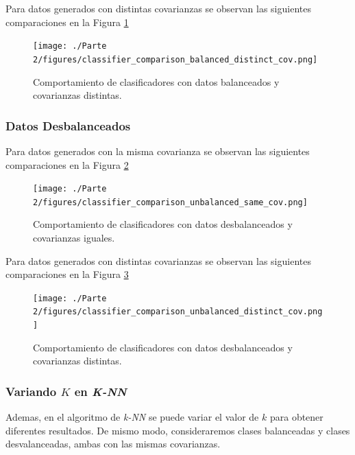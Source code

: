 \documentclass[10pt]{article}
\begin{document}
Para datos generados con distintas covarianzas se observan las siguientes
comparaciones en la Figura \ref{fig:classifier-comparison-balanced-distinct-cov}

\begin{figure}[ht]
    \centering
    \texttt{[image: ./Parte 2/figures/classifier\_comparison\_balanced\_distinct\_cov.png]}
    \caption{Comportamiento de clasificadores con datos balanceados y covarianzas distintas.}    
    \label{fig:classifier-comparison-balanced-distinct-cov}
\end{figure}



\subsubsection*{Datos Desbalanceados}

Para datos generados con la misma covarianza se observan las siguientes
comparaciones en la Figura \ref{fig:classifier-comparison-unbalanced-same-cov}

\begin{figure}[ht]
    \centering
    \texttt{[image: ./Parte 2/figures/classifier\_comparison\_unbalanced\_same\_cov.png]}
    \caption{Comportamiento de clasificadores con datos desbalanceados y covarianzas iguales.}    
    \label{fig:classifier-comparison-unbalanced-same-cov}
\end{figure}

\newpage

Para datos generados con distintas covarianzas se observan las siguientes
comparaciones en la Figura \ref{fig:classifier-comparison-unbalanced-distinct-cov}

\begin{figure}[ht]
    \centering
    \texttt{[image: ./Parte 2/figures/classifier\_comparison\_unbalanced\_distinct\_cov.png]}
    \caption{Comportamiento de clasificadores con datos desbalanceados y covarianzas distintas.}    
    \label{fig:classifier-comparison-unbalanced-distinct-cov}
\end{figure}


\subsubsection*{Variando $K$ en \textit{K-NN}}

Ademas, en el algoritmo de \textit{k-NN} se puede variar el valor de $k$ para
obtener diferentes resultados. De mismo modo, consideraremos clases balanceadas
y clases desvalanceadas, ambas con las mismas covarianzas.
\end{document}
